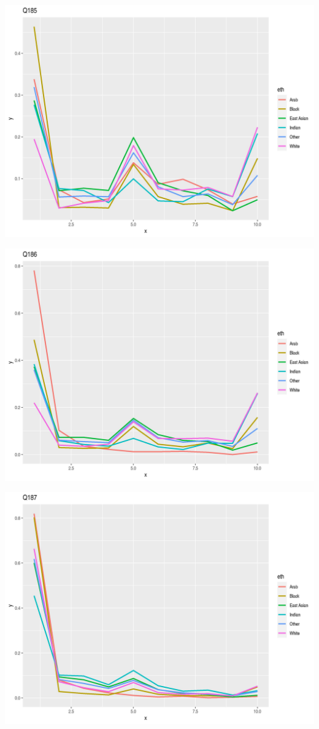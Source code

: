 \documentclass{amsart}
\begin{document}
\includegraphics[scale=0.7]{q185.jpeg}

\includegraphics[scale=0.7]{q186.jpeg}

\includegraphics[scale=0.7]{q187.jpeg}
\end{document}
